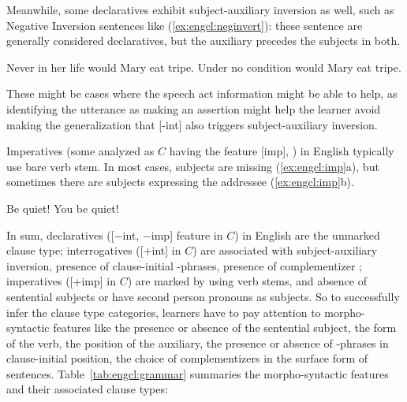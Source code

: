 Meanwhile, some declaratives exhibit subject-auxiliary inversion as well, such as Negative Inversion sentences like (\ref{ex:engcl:neginvert}): these sentence are generally considered declaratives, but the auxiliary  precedes the subjects in both.

\bxl{}
Never in her life would Mary eat tripe.
\ex
Under no condition would Mary eat tripe.
\exl
\eex

These might be cases where the speech act information might be able to help, as identifying the utterance as making an assertion might help the learner avoid making the generalization that [-int] also triggers subject-auxiliary inversion. 

Imperatives (some analyzed as $C$ having the feature [imp], \cite{platzack1997imp}) in English typically use bare verb stem. In most cases, subjects are missing (\ref{ex:engcl:imp}a), but sometimes there are subjects expressing the addressee (\ref{ex:engcl:imp}b).

\bxl{}
Be quiet!
\ex You be quiet!
\exl
\eex


In sum, declaratives ([$-$int, $-$imp] feature in $C$) in English are the unmarked clause type; interrogatives ([+int] in $C$) are associated with subject-auxiliary inversion, presence of clause-initial \twh-phrases, presence of complementizer ; imperatives ([+imp] in $C$) are marked by using verb stems, and absence of sentential subjects or have second person pronouns as subjects. So to successfully infer the clause type categories, learners have to pay attention to morpho-syntactic features like the presence or absence of the sentential subject, the form of the verb, the position of the auxiliary, the presence or absence of \twh-phrases in clause-initial position, the choice of complementizers in the surface form of sentences. Table~\ref{tab:engcl:grammar} summaries the morpho-syntactic features and their associated clause types:


